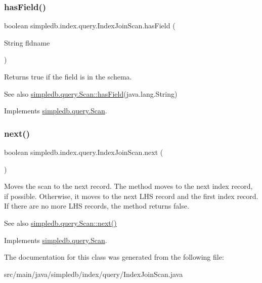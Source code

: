 \subsubsection{\texorpdfstring{has\+Field()}{hasField()}}
{\footnotesize\ttfamily boolean simpledb.\+index.\+query.\+Index\+Join\+Scan.\+has\+Field (\begin{DoxyParamCaption}\item[{String}]{fldname }\end{DoxyParamCaption})\hspace{0.3cm}{\ttfamily [inline]}}

Returns true if the field is in the schema. \begin{DoxySeeAlso}{See also}
\hyperlink{interfacesimpledb_1_1query_1_1Scan_a8f4ccf13eed0bed983c928e9b998fe5c}{simpledb.\+query.\+Scan\+::has\+Field}(java.\+lang.\+String) 
\end{DoxySeeAlso}


Implements \hyperlink{interfacesimpledb_1_1query_1_1Scan_a8f4ccf13eed0bed983c928e9b998fe5c}{simpledb.\+query.\+Scan}.

\mbox{\label{classsimpledb_1_1index_1_1query_1_1IndexJoinScan_a5d91dbe6fb77001095d3fc0830bb2d24}} 
\subsubsection{\texorpdfstring{next()}{next()}}
{\footnotesize\ttfamily boolean simpledb.\+index.\+query.\+Index\+Join\+Scan.\+next (\begin{DoxyParamCaption}{ }\end{DoxyParamCaption})\hspace{0.3cm}{\ttfamily [inline]}}

Moves the scan to the next record. The method moves to the next index record, if possible. Otherwise, it moves to the next L\+HS record and the first index record. If there are no more L\+HS records, the method returns false. \begin{DoxySeeAlso}{See also}
\hyperlink{interfacesimpledb_1_1query_1_1Scan_a5fc77b7c76d91f89f6c09ac4f15ef351}{simpledb.\+query.\+Scan\+::next()} 
\end{DoxySeeAlso}


Implements \hyperlink{interfacesimpledb_1_1query_1_1Scan_a5fc77b7c76d91f89f6c09ac4f15ef351}{simpledb.\+query.\+Scan}.



The documentation for this class was generated from the following file\+:\begin{DoxyCompactItemize}
\item 
src/main/java/simpledb/index/query/Index\+Join\+Scan.\+java\end{DoxyCompactItemize}
